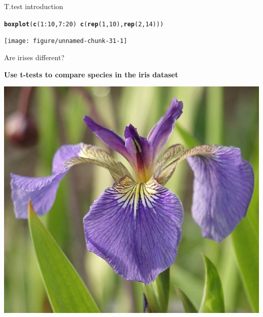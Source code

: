 \documentclass[10pt]{beamer}\usepackage[]{graphicx}\usepackage[]{color}
\makeatletter
\newcommand{\hlnum}[1]{\textcolor[rgb]{0.686,0.059,0.569}{#1}}%
\newcommand{\hlopt}[1]{\textcolor[rgb]{0,0,0}{#1}}%
\newcommand{\hlstd}[1]{\textcolor[rgb]{0.345,0.345,0.345}{#1}}%
\newcommand{\hlkwd}[1]{\textcolor[rgb]{0.737,0.353,0.396}{\textbf{#1}}}%
\newenvironment{kframe}{%
 \def\at@end@of@kframe{}%
 \ifinner\ifhmode%
  \def\at@end@of@kframe{\end{minipage}}%
  \begin{minipage}{\columnwidth}%
 \fi\fi%
 \def\FrameCommand##1{\hskip\@totalleftmargin \hskip-\fboxsep
 \colorbox{shadecolor}{##1}\hskip-\fboxsep
     \hskip-\linewidth \hskip-\@totalleftmargin \hskip\columnwidth}%
 \MakeFramed {\advance\hsize-\width
   \@totalleftmargin\z@ \linewidth\hsize
   \@setminipage}}%
 {\par\unskip\endMakeFramed%
 \at@end@of@kframe}
\newenvironment{knitrout}{}{} %
\makeatother
\begin{document}
\begin{frame}[fragile]{T.test introduction}%

\begin{knitrout}
\color{fgcolor}\begin{kframe}
\begin{alltt}
  \hlkwd{boxplot}\hlstd{(}\hlkwd{c}\hlstd{(}\hlnum{1}\hlopt{:}\hlnum{10}\hlstd{,} \hlnum{7}\hlopt{:}\hlnum{20}\hlstd{)} \hlopt{~} \hlkwd{c}\hlstd{(}\hlkwd{rep}\hlstd{(}\hlnum{1}\hlstd{,}\hlnum{10}\hlstd{),} \hlkwd{rep}\hlstd{(}\hlnum{2}\hlstd{,} \hlnum{14}\hlstd{)))}
\end{alltt}
\end{kframe}
\texttt{[image: figure/unnamed-chunk-31-1]} 

\end{knitrout}
\end{frame}

\begin{frame}[fragile]{Are irises different?}

  \textbf{Use t-tests to compare species in the iris dataset}

  \begin{center}
    \includegraphics[height=0.6\textwidth]{Figures/iris}
  \end{center}
\end{frame}
\end{document}
